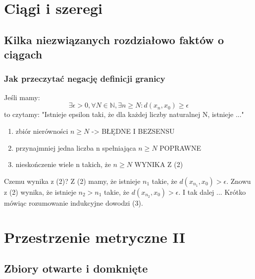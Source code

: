 \documentclass{article}
\begin{document}
\section{Ciągi i szeregi}

\subsection{Kilka niezwiązanych rozdziałowo faktów o ciągach}

\subsubsection{Jak przeczytać negację definicji granicy}
Jeśli mamy:
\begin{equation*}
    \exists \epsilon > 0, \forall N \in \mathbb{N}, \exists n \geq N: d(x_n, x_0) \geq \epsilon
\end{equation*}
to czytamy: "Istnieje epsilon taki, że dla każdej liczby naturalnej N, istnieje ..."

\begin{enumerate}
    \item  zbiór nierówności \(n \geq N\) -> BŁĘDNE I BEZSENSU
    \item przynajmniej jedna liczba n spełniająca \(n \geq N\) POPRAWNE
    \item nieskończenie wiele n takich, że \(n \geq N\) WYNIKA Z (2)
\end{enumerate}

Czemu wynika z (2)? Z (2) mamy, że istnieje \(n_1\) takie, że \(d(x_{n_1},x_0) > \epsilon\). 
Znowu z (2) wynika, że istnieje \(n_2>n_1\) takie, że \(d(x_{n_2},x_0)> \epsilon\). I tak dalej ...
Krótko mówiąc rozumowanie indukcyjne dowodzi (3).

\section{Przestrzenie metryczne II}
\subsection{Zbiory otwarte i domknięte}
\end{document}
